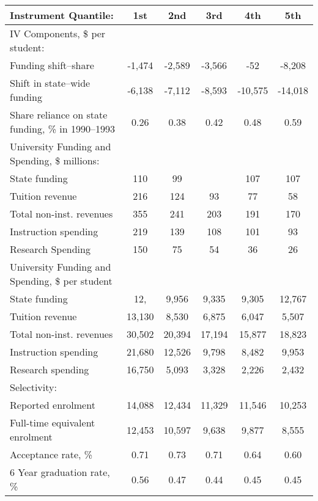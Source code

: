 \begin{tabular}{lccccc}
  \hline
Instrument Quantile: & 1st & 2nd & 3rd & 4th & 5th \\ 
  \hline
IV Components, \$ per student: &  &  &  &  &  \\ 
  Funding shift--share & -1,474 & -2,589 & -3,566 & -52 & -8,208 \\ 
  Shift in state--wide funding & -6,138 & -7,112 & -8,593 & -10,575 & -14,018 \\ 
  Share reliance on state funding, \% in 1990--1993 & 0.26 & 0.38 & 0.42 & 0.48 & 0.59 \\ 
  \hline University Funding and Spending, \$ millions: &  &  &  &  &  \\ 
  State funding & 110 & 99 &  & 107 & 107 \\ 
  Tuition revenue & 216 & 124 & 93 & 77 & 58 \\ 
  Total non-inst. revenues & 355 & 241 & 203 & 191 & 170 \\ 
  Instruction spending & 219 & 139 & 108 & 101 & 93 \\ 
  Research Spending & 150 & 75 & 54 & 36 & 26 \\ 
  \hline University Funding and Spending, \$ per student &  &  &  &  &  \\ 
  State funding & 12, & 9,956 & 9,335 & 9,305 & 12,767 \\ 
  Tuition revenue & 13,130 & 8,530 & 6,875 & 6,047 & 5,507 \\ 
  Total non-inst. revenues & 30,502 & 20,394 & 17,194 & 15,877 & 18,823 \\ 
  Instruction spending & 21,680 & 12,526 & 9,798 & 8,482 & 9,953 \\ 
  Research spending & 16,750 & 5,093 & 3,328 & 2,226 & 2,432 \\ 
  \hline Selectivity: &  &  &  &  &  \\ 
  Reported enrolment & 14,088 & 12,434 & 11,329 & 11,546 & 10,253 \\ 
  Full-time equivalent enrolment & 12,453 & 10,597 & 9,638 & 9,877 & 8,555 \\ 
  Acceptance rate, \% & 0.71 & 0.73 & 0.71 & 0.64 & 0.60 \\ 
  6 Year graduation rate, \% & 0.56 & 0.47 & 0.44 & 0.45 & 0.45 \\ 
   \hline
\end{tabular}
